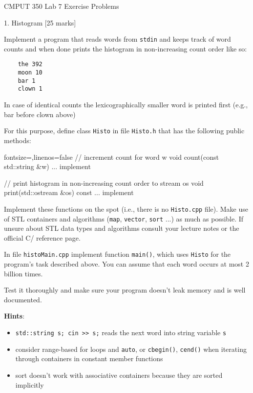 \documentclass[a4paper,11pt]{article}
\begin{document}

\begin{center}
{\Large CMPUT 350 Lab 7 Exercise Problems}
\end{center}



1. Histogram [25 marks]

Implement a program that reads words from \texttt{stdin} and keeps track of word counts
and when done prints the histogram in non-increasing count order like so:

{\small
\begin{verbatim}
    the 392
    moon 10
    bar 1
    clown 1
\end{verbatim}
}

In case of identical counts the lexicographically smaller word is printed
first (e.g., bar before clown above)

\medskip

For this purpose, define class \texttt{Histo} in file \texttt{Histo.h} that has the following
public methods:
\begin{cppcode*}{fontsize=\footnotesize,linenos=false}
// increment count for word w
void count(const std::string &w) {
    ... implement
}

// print histogram in non-increasing count order to stream os
void print(std::ostream &os) const {
    ... implement
}
\end{cppcode*}

Implement these functions on the spot (i.e., there is no \texttt{Histo.cpp} file). Make
use of STL containers and algorithms (\texttt{map}, \texttt{vector}, \texttt{sort} ...) as much as
possible. If unsure about STL data types and algorithms consult your lecture
notes or the official C/{\CC} reference page.

\medskip 

In file \texttt{histoMain.cpp} implement function \texttt{main()}, which uses \texttt{Histo} for the
program's task described above. You can assume that each word occurs at most 2
billion times.

\medskip 

Test it thoroughly and make sure your program doesn't leak memory and is well
documented.

\medskip 

\textbf{Hints}:
\begin{itemize}
    \item \texttt{std::string s; cin >> s;} reads the next word into string variable \texttt{s}
    \item consider range-based for loops and \texttt{auto}, or \texttt{cbegin()}, \texttt{cend()} when iterating
    through containers in constant member functions
    \item sort doesn't work with associative containers because they are sorted implicitly
\end{itemize}
\end{document}
